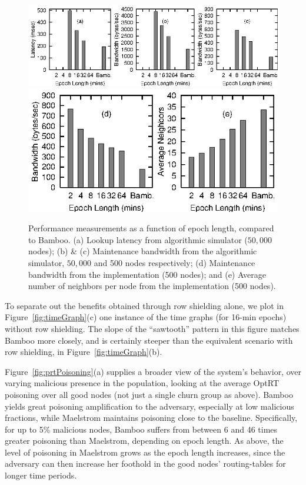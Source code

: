\documentclass[10pt,twocolumn]{article}
\newcommand{\PRT}{OptRT\xspace}
\begin{document}
\begin{figure}
\centerline{\includegraphics{graphs/simPerformance}\includegraphics{bw_results/bwneighbors}}
\caption{Performance measurements as a function of epoch length,
  compared to Bamboo. (a) Lookup latency from algorithmic simulator
  ($50,000$ nodes); (b) \& (c) Maintenance bandwidth from the algorithmic
  simulator, $50,000$ and 500 nodes respectively; (d) Maintenance
  bandwidth from the implementation (500 nodes); and (e) Average number of neighbors
  per node from the implementation (500 nodes).}
\label{fig:performance}
\end{figure}



To separate out the benefits obtained through row shielding alone, we
plot in Figure~\ref{fig:timeGraph}(c) one instance of the time graphs
(for 16-min epochs)
without row shielding.  The slope of the ``sawtooth'' pattern in this
figure matches Bamboo more closely, and is certainly steeper than the
equivalent scenario with
row shielding, in Figure~\ref{fig:timeGraph}(b).




Figure~\ref{fig:prtPoisoning}(a) supplies a broader view of the system's
behavior, over varying malicious presence in the population,
looking at the average \PRT poisoning over all good nodes (not just a
single churn group as above).
Bamboo yields great poisoning amplification to the adversary, especially
at low malicious fractions, while Maelstrom
maintains poisoning close to the baseline. Specifically, for up to 5\%
malicious nodes, Bamboo suffers from between 6 and
46 times greater poisoning than Maelstrom, depending on epoch length.
As above, the level of
poisoning in Maelstrom grows as the epoch length increases, since the
adversary can then increase her foothold in the good nodes'
routing-tables for longer time periods.
\end{document}

